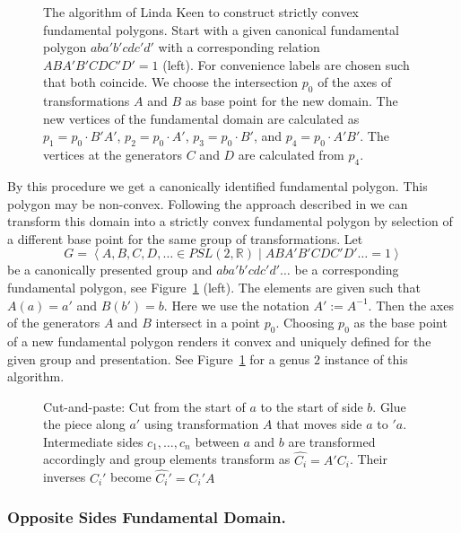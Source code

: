 \documentclass[Thesis]{subfiles}
\begin{document}
\begin{figure}
\centering
{}
\caption{
The algorithm of Linda Keen to construct strictly convex fundamental polygons. 
Start with a given canonical fundamental polygon $aba'b'cdc'd'$ with a corresponding relation $ABA'B'CDC'D'=1$ (left). 
For convenience labels are chosen such that both coincide. 
We choose the intersection $p_0$ of the axes of transformations $A$ and $B$ as base point for the new domain. 
The new vertices of the fundamental domain are calculated as $p_1=p_0\cdot B'A'$, $p_2=p_0\cdot A'$, $p_3=p_0\cdot B'$, and $p_4=p_0\cdot A'B'$. 
The vertices at the generators $C$ and $D$ are calculated from $p_4$.
}
\label{fig:keen_polygon}
\end{figure}

By this procedure we get a canonically identified fundamental polygon. 
This polygon may be non-convex. Following the approach described in \cite{keen1966} we can transform this domain into a strictly convex fundamental polygon by selection of a different base point for the same group of transformations. Let
\begin{equation}
G=\left<A,B,C,D,\ldots\in \mathit{PSL}(2,\mathbb R)\mid ABA'B'CDC'D'\ldots=1\right>
\end{equation}
be a canonically presented group and $aba'b'cdc'd'\ldots$ be a corresponding fundamental polygon, see Figure~\ref{fig:keen_polygon} (left). 
The elements are given such that $A(a)=a'$ and $B(b')=b$. 
Here we use the notation $A':=A^{-1}$. 
Then the axes of the generators $A$ and $B$ intersect in a point $p_0$. 
Choosing $p_0$ as the base point of a new fundamental polygon renders it convex and uniquely defined for the given group and presentation. 
See Figure~\ref{fig:keen_polygon} for a genus $2$ instance of this algorithm.

\begin{figure}
\centering
\resizebox{0.4\textwidth}{!} {

}
\caption{Cut-and-paste: Cut from the start of $a$ to the start of side $b$. Glue the piece along $a'$ using transformation $A$ that moves side $a$ to $'a$. Intermediate sides $c_1,\ldots,c_n$ between $a$ and $b$ are transformed accordingly and group elements transform as $\hat{C_i}=A'C_i$. Their inverses $C_i'$ become $\hat{C_i}'=C_i'A$}
\label{fig:cut-and-paste-canonical}
\end{figure}

\subsubsection*{Opposite Sides Fundamental Domain.}
\end{document}
